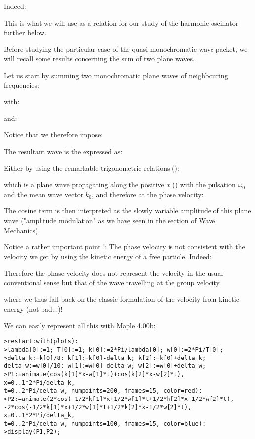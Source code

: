 	Indeed:
	
	This is what we will use as a relation for our study of the harmonic oscillator further below.

	Before studying the particular case of the quasi-monochromatic wave packet, we will recall some results concerning the sum of two plane waves.

	Let us start by summing two monochromatic plane waves of neighbouring frequencies:
	
	with:
	
	and:
	
	Notice that we therefore impose:
	
	The resultant wave is the expressed as:
	
	Either by using the remarkable trigonometric relations ():
	
	which is a plane wave propagating along the positive $x$ () with the pulsation $\omega_0$ and the mean wave vector $k_0$, and therefore at the phase velocity:
	
	The cosine term is then interpreted as the slowly variable amplitude of this plane wave ("amplitude modulation" as we have seen in the section of Wave Mechanics).

	Notice a rather important point !: The phase velocity is not consistent with the velocity we get by using the kinetic energy of a free particle. Indeed:
	
	Therefore the phase velocity does not represent the velocity in the usual conventional sense but that of the wave travelling at the group velocity\label{wave velocity group traveling wave}
	
	where we thus fall back on the classic formulation of the velocity from kinetic energy (not bad...)!

	We can easily represent all this with Maple 4.00b:
	

	\texttt{>restart:with(plots):\\
	>lambda[0]:=1; T[0]:=1; k[0]:=2*Pi/lambda[0]; w[0]:=2*Pi/T[0];\\
	>delta\_k:=k[0]/8: k[1]:=k[0]-delta\_k; k[2]:=k[0]+delta\_k;\\
delta\_w:=w[0]/10: w[1]:=w[0]-delta\_w; w[2]:=w[0]+delta\_w;\\
	>P1:=animate(cos(k[1]*x-w[1]*t)+cos(k[2]*x-w[2]*t), x=0..1*2*Pi/delta\_k, \\
	t=0..2*Pi/delta\_w, numpoints=200, frames=15, color=red):\\
	>P2:=animate({2*cos(-1/2*k[1]*x+1/2*w[1]*t+1/2*k[2]*x-1/2*w[2]*t), \\
	-2*cos(-1/2*k[1]*x+1/2*w[1]*t+1/2*k[2]*x-1/2*w[2]*t)}, x=0..1*2*Pi/delta\_k,\\
	 t=0..2*Pi/delta\_w, numpoints=100, frames=15, color=blue):\\
	>display(P1,P2);}
	
